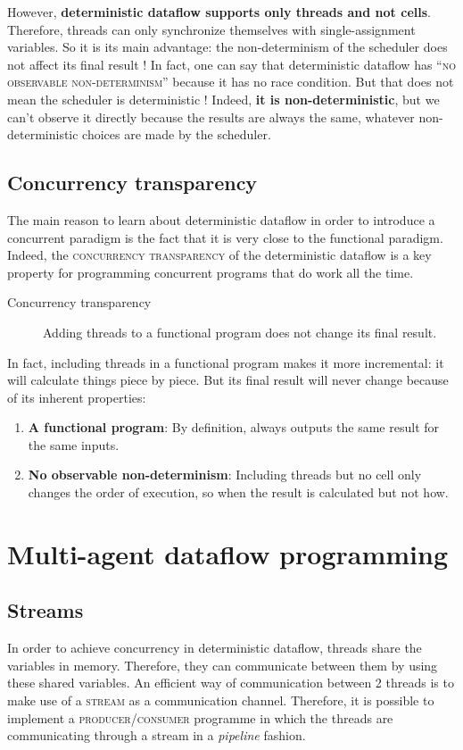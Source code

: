 \documentclass[11pt,a4paper,twoside,openright]{report}
\begin{document}
However, \textbf{deterministic dataflow supports only threads and not cells}. 
Therefore, threads can only synchronize themselves with single-assignment 
variables. So it is its main advantage: the non-determinism of the scheduler does 
not affect its final result ! In fact, one can say that deterministic dataflow 
has \enquote{\textsc{no observable non-determinism}} because it has no race 
condition. But that does not mean the scheduler is deterministic ! Indeed, 
\textbf{it is non-deterministic}, but we can't observe it directly because the 
results are always the same, whatever non-deterministic choices are made by the 
scheduler.

\subsection{Concurrency transparency}

The main reason to learn about deterministic dataflow in order to introduce a 
concurrent paradigm is the fact that it is very close to the functional 
paradigm. Indeed, the \textsc{concurrency transparency} of the deterministic 
dataflow is a key property for programming concurrent programs that do work 
all the time.

\begin{description}
 \item[Concurrency transparency] Adding threads to a functional program does 
not change its final result.
\end{description}

In fact, including threads in a functional program makes it more incremental: 
it will calculate things piece by piece. But its final result will never change 
because of its inherent properties:
% 
\begin{enumerate}
  \item \textbf{A functional program}: By definition, always outputs the same 
result for the same inputs.
  \item \textbf{No observable non-determinism}: Including threads but no cell 
only changes the order of execution, so when the result is calculated but not 
how.
\end{enumerate}


\section{Multi-agent dataflow programming}

\subsection{Streams}
In order to achieve concurrency in deterministic dataflow, threads share the 
variables in memory. Therefore, they can communicate between them by using 
these 
shared variables. An efficient way of communication between 2 threads is to 
make 
use of a \textsc{stream} as a communication channel. Therefore, it is possible 
to implement a \textsc{producer/consumer} programme in which the threads are 
communicating through a stream in a \textit{pipeline} fashion.
\end{document}
